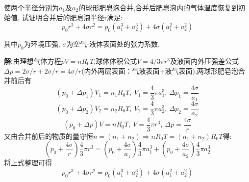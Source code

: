 \begin{problem}[问题1.2]
使两个半径分别为$a_1$及$a_2$的球形肥皂泡合并,合并后肥皂泡内的气体温度恢复到初始值,
试证明合并后的肥皂泡半径r满足:
\[
p_0r^3+4\sigma r^2 = p_0(a_1^3+a_2^3)+4\sigma(a_1^2+a_2^2)
\]

其中$p_0$为环境压强, $\sigma$为空气-液体表面处的张力系数.
\end{problem}

\begin{solution}
\textbf{解:}由理想气体方程$pV=nR_0T$,球体体积公式$V=4/3\pi r^3$及液面内外压强差公式$\Delta p = 2\sigma/r+2\sigma/r=4\sigma/r$(内外两层表面：气液表面+液气表面),两球形肥皂泡合并前后有
\[
(p_0+\Delta p_1)V_1 = n_1R_0T, {~} V_1 = \frac{4}{3}\pi a_1^3, {~} \Delta p_1 = \frac{4\sigma}{a_1}
\]
\[
(p_0+\Delta p_2)V_2 = n_2R_0T, {~} V_2 = \frac{4}{3}\pi a_2^3, {~} \Delta p_2 = \frac{4\sigma}{a_2}
\]
\[
(p_0+\Delta p)V = nR_0T, {~} V = \frac{4}{3}\pi r^3, {~} \Delta p = \frac{4\sigma}{r}
\]
又由合并前后的物质的量守恒$n=(n_1+n_2)\Rightarrow nR_0T = (n_1+n_2)R_0T$得:
\[
(p_0+\frac{4\sigma}{r})\frac{4}{3}\pi r^3 = (p_0+\frac{4\sigma}{a_1})\frac{4}{3}\pi a_1^3 + (p_0+\frac{4\sigma}{a_2})\frac{4}{3}\pi a_2^3
\]
将上式整理可得
\[
p_0r^3+4\sigma r^2 = p_0(a_1^3+a_2^3)+4\sigma(a_1^2+a_2^2)
\]
\end{solution}
